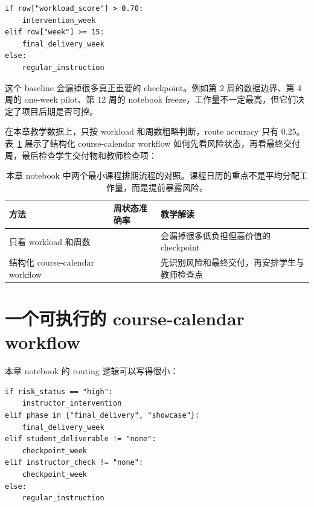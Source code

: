 \begin{examplebox}
\begin{lstlisting}[style=pythonstyle]
if row["workload_score"] > 0.70:
    intervention_week
elif row["week"] >= 15:
    final_delivery_week
else:
    regular_instruction
\end{lstlisting}
\end{examplebox}

这个 baseline 会漏掉很多真正重要的 checkpoint。例如第 2 周的数据边界、第 4 周的 one-week pilot、第 12 周的 notebook freeze，工作量不一定最高，但它们决定了项目后期是否可控。

在本章教学数据上，只按 workload 和周数粗略判断，route accuracy 只有 0.25。表~\ref{tab:ch44_workload_vs_calendar} 展示了结构化 course-calendar workflow 如何先看风险状态，再看最终交付周，最后检查学生交付物和教师检查项：

\begin{table}[htbp]
\centering
\small
\setlength{\tabcolsep}{4pt}
\begin{tabular}{@{}p{}>{\centering\arraybackslash}p{}p{}@{}}
\toprule
方法 & 周状态准确率 & 教学解读 \\
\midrule
只看 workload 和周数 & 0.25 & 会漏掉很多低负担但高价值的 checkpoint \\
结构化 course-calendar workflow & 1.00 & 先识别风险和最终交付，再安排学生与教师检查点 \\
\bottomrule
\end{tabular}
\caption{本章 notebook 中两个最小课程排期流程的对照。课程日历的重点不是平均分配工作量，而是提前暴露风险。}
\label{tab:ch44_workload_vs_calendar}
\end{table}

\section{一个可执行的 course-calendar workflow}

本章 notebook 的 routing 逻辑可以写得很小：

\begin{examplebox}
\begin{lstlisting}[style=pythonstyle]
if risk_status == "high":
    instructor_intervention
elif phase in {"final_delivery", "showcase"}:
    final_delivery_week
elif student_deliverable != "none":
    checkpoint_week
elif instructor_check != "none":
    checkpoint_week
else:
    regular_instruction
\end{lstlisting}
\end{examplebox}

